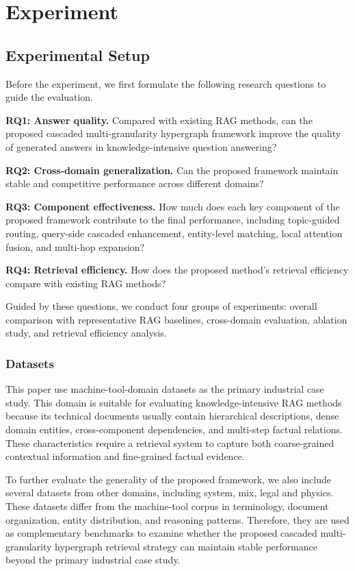 \documentclass[preprint,12pt]{elsarticle}
\begin{document}
\section{Experiment}
\subsection{Experimental Setup}

Before the experiment, we first formulate the following research questions to guide the evaluation.

\textbf{RQ1: Answer quality.} Compared with existing RAG methods, can the proposed cascaded multi-granularity hypergraph framework improve the quality of generated answers in knowledge-intensive question answering?

\textbf{RQ2: Cross-domain generalization.} Can the proposed framework maintain stable and competitive performance across different domains?

\textbf{RQ3: Component effectiveness.} How much does each key component of the proposed framework contribute to the final performance, including topic-guided routing, query-side cascaded enhancement, entity-level matching, local attention fusion, and multi-hop expansion?

\textbf{RQ4: Retrieval efficiency.} How does the proposed method's retrieval efficiency compare with existing RAG methods?

Guided by these questions, we conduct four groups of experiments: overall comparison with representative RAG baselines, cross-domain evaluation, ablation study, and retrieval efficiency analysis.
\subsubsection{Datasets}

This paper use machine-tool-domain datasets as the primary industrial case study. This domain is suitable for evaluating knowledge-intensive RAG methods because its technical documents usually contain hierarchical descriptions, dense domain entities, cross-component dependencies, and multi-step factual relations. These characteristics require a retrieval system to capture both coarse-grained contextual information and fine-grained factual evidence.

To further evaluate the generality of the proposed framework, we also include several datasets from other domains, including system, mix, legal and physics. These datasets differ from the machine-tool corpus in terminology, document organization, entity distribution, and reasoning patterns. Therefore, they are used as complementary benchmarks to examine whether the proposed cascaded multi-granularity hypergraph retrieval strategy can maintain stable performance beyond the primary industrial case study.
\end{document}
